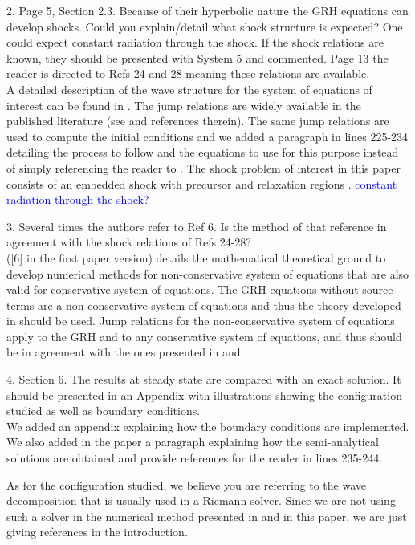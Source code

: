 \documentclass{article}
\newcommand{\tcb}[1]{\textcolor{blue}{#1}}
\begin{document}
{\color{blue}
2. Page 5, Section 2.3. Because of their hyperbolic nature the GRH equations can develop shocks.
Could you explain/detail what shock structure is expected? One could expect constant radiation through the shock.
If the shock relations are known, they should be presented with System 5 and commented. Page 13 the reader is directed to Refs 24 and 28 meaning these relations are available.\\}
A detailed description of the wave structure for the system of equations of interest can be found in \cite{Balsara}. The jump relations are widely available in the published literature (see \cite{LowrieEdwards, LowrieMorelHittinger} and references therein). The same jump relations are used to compute the initial conditions and we added a paragraph in lines 225-234 detailing the process to follow and the equations to use for this purpose instead of simply referencing the reader to \cite{LowrieEdwards}. The shock problem of interest in this paper consists of an embedded shock with precursor and relaxation regions \cite{LowrieEdwards}.
\tcb{constant radiation through the shock?}
\bigskip

{\color{blue}
3. Several times the authors refer to Ref 6. Is the method of that reference in agreement with the shock relations of Refs 24-28?
\\}
\cite{dlm} ([6] in the first paper version) details the mathematical theoretical ground to develop numerical methods for non-conservative system of equations that are also valid for conservative system of equations. The GRH equations without source terms are a non-conservative system of equations and thus the theory developed in \cite{dlm} should be used. Jump relations for the non-conservative system of equations apply to the GRH and to any conservative system of equations, and thus should be in agreement with the ones presented in \cite{LowrieEdwards} and \cite{Toro}.
\bigskip

{\color{blue}
4. Section 6. The results at steady state are compared with an exact solution. It should be presented in an Appendix with illustrations showing the configuration studied as well as boundary conditions. \\}
We added an appendix explaining how the boundary conditions are implemented. We also added in the paper a paragraph explaining how the semi-analytical solutions are obtained and provide references for the reader in lines 235-244.

As for the configuration studied, we believe you are referring to the wave decomposition that is usually used in a Riemann solver. Since we are not using such a solver in the numerical method presented in \cite{our_jcp_radhy_paper} and in this paper, we are just giving references in the introduction.
\bigskip
\end{document}
